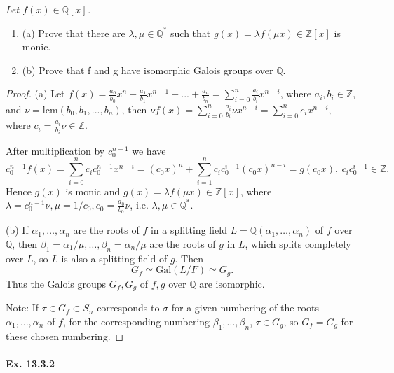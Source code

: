 \documentclass[11pt,a4paper]{article}
\newcommand{\be} {\begin{enumerate}}
\newcommand{\ee} {\end{enumerate}}
\newcommand{\Q}{\mathbb{Q}}
\newcommand{\Z}{\mathbb{Z}}
\newcommand{\Gal}{\mathrm{Gal}}
\begin{document}
{\it Let $f(x) \in \Q[x]$.
\be
\item[(a)] Prove that there are $\lambda, \mu \in \Q^*$ such that $g(x)=\lambda f(\mu x)\in\Z[x]$ is monic.
\item[(b)] Prove that f and g have isomorphic Galois groups over $\Q$.
\ee
\begin{proof}
\item[(a)] Let $f(x)=\frac {a_0}{b_0}x^n+\frac {a_1}{b_1}x^{n-1}+...+\frac {a_n}{b_n}=\sum_{i=0}^n \frac {a_i}{b_i}x^{n-i}$, where $a_i,b_i \in \Z$, and $\nu=\mathrm{lcm}(b_0,b_1,...,b_n)$, then $\nu f(x)=\sum_{i=0}^n \frac {a_i}{b_i}\nu x^{n-i}=\sum_{i=0}^n c_i x^{n-i}$, where $c_i=\frac {a_i}{b_i}\nu \in \Z$.

After multiplication by $c_0^{n-1}$ we have $$c_0^{n-1}f(x)=\sum_{i=0}^n c_i c_0^{n-1} x^{n-i}=(c_0 x)^n+\sum_{i=1}^n c_i c_0^{i-1} (c_0 x)^{n-i}=g(c_0 x), ~ c_i c_0^{i-1} \in \Z.$$ Hence $g(x)$ is monic   and $g(x)=\lambda f(\mu x)\in\Z[x]$, where $\lambda=c_0^{n-1}\nu,\mu=1/c_0, c_0=\frac{a_0}{b_0} \nu$, i.e. $\lambda,\mu \in \Q^*$.

 \item[(b)] If $\alpha_1,\ldots,\alpha_n$ are the roots of $f$ in a splitting field $L = \Q(\alpha_1,\ldots,\alpha_n)$ of $f$ over $\Q$, then $\beta_1 = \alpha_1/\mu,\ldots,\beta_n = \alpha_n/\mu$ are the roots of $g$ in $L$, which splits completely over $L$, so $L$ is also a splitting field of $g$.
 Then 
 $$G_f \simeq \Gal(L/F) \simeq G_g.$$
 Thus the Galois groups $G_f, G_g$ of $f,g$ over $\Q$ are isomorphic.
 
Note: If $\tau \in G_f \subset S_n$ corresponds to $\sigma$ for a given numbering of the roots $\alpha_1,\ldots,\alpha_n$ of $f$, for the corresponding numbering $\beta_1,\ldots,\beta_n$,  $\tau \in G_g$, so $G_f = G_g$ for these chosen numbering.

\end{proof}
}

\paragraph{Ex. 13.3.2}
\end{document}
